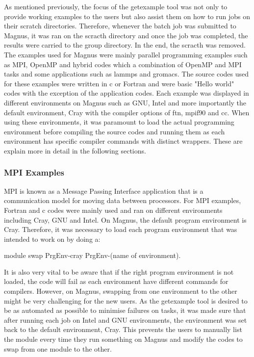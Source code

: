 \documentclass[journal]{IEEEtran}
\begin{document}
As mentioned previously, the focus of the getexample tool was not only to provide working examples to the users but also assist them on how to run jobs
on their scratch directories. Therefore, whenever the batch job was submitted to Magnus, it was ran on the scracth directory and once the job was 
completed, the results were carried to the group directory. In the end, the scracth was removed. The examples used for Magnus were mainly parallel
programming examples such as MPI, OpenMP and hybrid codes which a combination of OpenMP and MPI tasks and some applications such as lammps and gromacs.
The source codes used for these examples were written in c or Fortran and were basic "Hello world" codes with the exception of the application codes.
Each example was displayed in different environments on Magnus such as GNU, Intel and more importantly the default environment, Cray with the compiler
options of ftn, mpif90 and cc. When using these environments, it was paramount to load the actual programming environment before compiling the source
codes and running them as each environment has specific compiler commands with distinct wrappers. These are explain more in detail in the following
sections.


\subsubsection{MPI Examples}

MPI is known as a Message Passing Interface application that is a communication model for moving data between processors. For MPI examples, Fortran and 
c codes were mainly used and ran on different environments including Cray, GNU and Intel. On Magnus, the default program environment is Cray. Therefore, 
it was necessary to load each program environment that was intended to work on by doing a:

module swap PrgEnv-cray PrgEnv-(name of environment). 

It is also very vital to be aware that if the right program environment is not loaded, the code will fail as each environment have different commands 
for compilers. However, on Magnus, swapping from one environment to the other might be very challenging for the new users. As the getexample tool is
desired to be as automated as possible to minimise failures on tasks, it was made sure that after running each job on Intel and GNU environments, the
environment was set back to the default environment, Cray. This prevents the users to manually list the module every time they run something on Magnus
and modify the codes to swap from one module to the other. 
\end{document}

